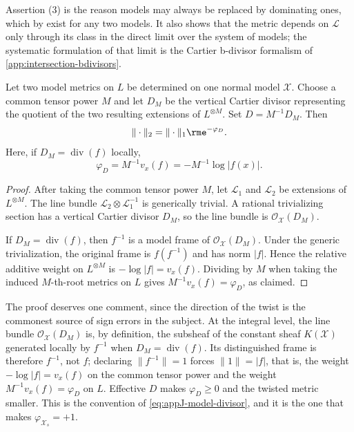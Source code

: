 Assertion (3) is the reason models may always be replaced by dominating
ones, which by  exist for any two models. It
also shows that the metric depends on $\mathcal L$ only through its class
in the direct limit over the system of models; the systematic formulation of
that limit is the Cartier b-divisor formalism of
\cref{app:intersection-bdivisors}.

\begin{proposition}\label{prop:metric-difference-model}
Let two model metrics on $L$ be determined on one normal model
$\mathcal X$. Choose a common tensor power $M$ and let $D_M$ be the
vertical Cartier divisor representing the quotient of the two resulting
extensions of $L^{\otimes M}$.  Set $D=M^{-1}D_M$.  Then
\[
                      \|\cdot\|_2=\|\cdot\|_1\rme^{-\varphi_D}.
\]
Here, if $D_M=\operatorname{div}(f)$ locally,
\[
       \varphi_D=M^{-1}v_x(f)=-M^{-1}\log|f(x)|.
\]
\end{proposition}

\begin{proof}
After taking the common tensor power $M$, let $\mathcal L_1$ and
$\mathcal L_2$ be extensions of $L^{\otimes M}$. The
line bundle $\mathcal L_2\otimes\mathcal L_1^{-1}$ is generically trivial.
A rational trivializing section has a vertical Cartier divisor $D_M$, so
the line bundle is $\mathcal O_{\mathcal X}(D_M)$.

If $D_M=\operatorname{div}(f)$, then $f^{-1}$ is a model frame of
$\mathcal O_{\mathcal X}(D_M)$. Under the generic trivialization, the
original frame is $f(f^{-1})$ and has norm $|f|$. Hence the relative
additive weight on $L^{\otimes M}$ is $-\log|f|=v_x(f)$.  Dividing by
$M$ when taking the induced $M$-th-root metrics on $L$ gives
$M^{-1}v_x(f)=\varphi_D$, as claimed.
\end{proof}

The proof deserves one comment, since the direction of the twist is the
commonest source of sign errors in the subject. At the integral level, the
line bundle $\mathcal O_{\mathcal X}(D_M)$ is, by definition, the subsheaf
of the constant sheaf $K(\mathcal X)$ generated locally by $f^{-1}$ when
$D_M=\operatorname{div}(f)$. Its distinguished frame is therefore
$f^{-1}$, not $f$; declaring $\|f^{-1}\|=1$ forces
$\|1\|=|f|$, that is, the weight $-\log|f|=v_x(f)$ on the common tensor
power and the weight $M^{-1}v_x(f)=\varphi_D$ on $L$. Effective $D$
makes $\varphi_D\ge0$ and the twisted metric smaller. This is the
convention of \eqref{eq:appJ-model-divisor}, and it is the one that makes
$\varphi_{\mathcal X_s}=+1$.

